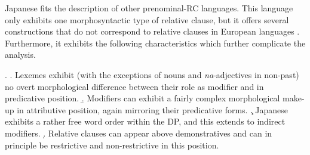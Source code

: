 Japanese fits the description of other prenominal-RC languages. This language only exhibits one morphosyntactic type of relative clause, but it offers several constructions that do not correspond to relative clauses in European languages \citep{comrie:1998:rethinking, matsumoto:2017:japanese}. Furthermore, it exhibits the following characteristics which further complicate the analysis.


\ex. \a. Lexemes exhibit (with the exceptions of nouns and \textit{na}-adjectives in non-past) no overt morphological difference between their role as modifier and in predicative position.
\b. Modifiers can exhibit a fairly complex morphological make-up in attributive position, again mirroring their predicative forms.
\c. Japanese exhibits a rather free word order within the DP, and this extends to indirect modifiers.
\d. Relative clauses can appear above demonstratives and can in principle be restrictive and non-restrictive in this position.

